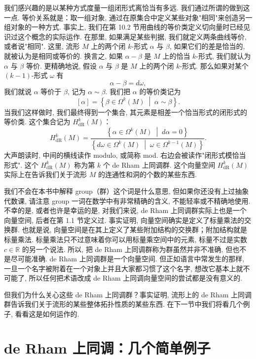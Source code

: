 我们感兴趣的是以某种方式度量一组闭形式离恰当有多远. 我们通过所谓的做到这一点. 等价关系就是：取一组对象, 通过在原集合中定义某些对象"相同"来创造另一组对象的一种方式. 事实上, 我们在第 10.2 节用曲线的等价类定义切向量时已经见识过这个概念的实际运作. 在那里, 如果满足某些判据, 我们就定义两条曲线等价, 或者说"相同". 这里, 流形 $M$ 上的两个闭 $k$-形式 $\alpha$ 与 $\beta$, 如果它们的差是恰当的, 就被认为是相同或等价的. 换言之, 如果 $\alpha-\beta$ 是 $M$ 上的恰当 $k$-形式, 我们就认为 $\alpha$ 与 $\beta$ 等价. 更精确地说, 假设 $\alpha$ 与 $\beta$ 是 $M$ 上的两个闭 $k$-形式. 那么如果对某个 $(k-1)$-形式 $\omega$ 有
\[
\alpha-\beta=d\omega,
\]
我们就说 $\alpha$ 等价于 $\beta$, 记为 $\alpha\sim\beta$. 我们把 $\alpha$ 的等价类记为
\[
[\alpha]=\left\{\beta\in\Omega^k(M)\;\middle|\;\alpha\sim\beta\right\}.
\]
当我们这样做时, 我们最终得到一个集合, 其元素是相差一个恰当形式的闭形式的等价类. 这个集合记为 $H_{\mathrm{dR}}^k(M)$：
\[
H_{\mathrm{dR}}^k(M)=\frac{\left\{\alpha\in\Omega^k(M)\;\middle|\;d\alpha=0\right\}}{\left\{d\omega\in\Omega^k(M)\;\middle|\;\omega\in\Omega^{k-1}(M)\right\}}.
\]
大声朗读时, 中间的横线读作 modulo, 或简称 mod. 右边会被读作"闭形式模恰当形式". 这个 $H_{\mathrm{dR}}^k(M)$ 称为第 $k$ 个 de Rham 上同调群. 这个向量空间 $H_{\mathrm{dR}}^k(M)$ 实际上在告诉我们关于流形 $M$ 的连通性和洞的个数的某些东西.

我们不会在本书中解释 group（群）这个词是什么意思, 但如果你还没有上过抽象代数课, 请注意 group 一词在数学中有非常精确的含义, 不能轻率或不精确地使用. 不幸的是, 或者也许是幸运的是, 对我们来说, de Rham 上同调群实际上也是一个向量空间, 后者在第 1.1 节定义过. 事实证明, 向量空间确实是定义了标量乘法的交换群. 也就是说, 向量空间是在其上定义了某些附加结构的交换群；附加结构就是标量乘法. 标量乘法只不过意味着你可以用标量乘空间中的元素, 标量不过是实数 $c\in\mathbb{R}$ 的另一个说法. 所以, 把 de Rham 上同调群称为群虽然并非不准确, 但也不是尽可能准确. de Rham 上同调群是一个向量空间. 但正如语言中常发生的那样, 一旦一个名字被附着在一个对象上并且大家都习惯了这个名字, 想改它基本上就不可能了, 所以任何把术语改成 de Rham 上同调向量空间的尝试都是没有意义的.

但我们为什么关心这些 de Rham 上同调群？事实证明, 流形上的 de Rham 上同调群告诉我们关于流形的某些整体拓扑性质的某些东西. 在下一节中我们将看几个例子, 看看这是如何运作的.

\section{de Rham 上同调：几个简单例子}

